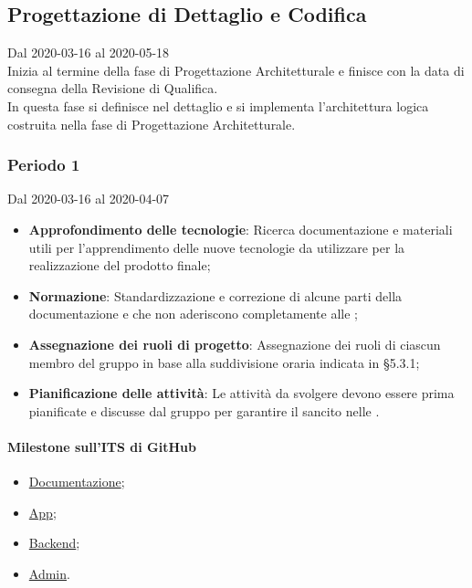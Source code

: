 \subsection{Progettazione di Dettaglio e Codifica}
Dal 2020-03-16 al 2020-05-18\\
Inizia al termine della fase di Progettazione Architetturale e finisce con la data di consegna della Revisione di Qualifica.\\
In questa fase si definisce nel dettaglio e si implementa l'architettura logica costruita nella fase di Progettazione Architetturale.

\subsubsection{Periodo 1} 
Dal 2020-03-16 al 2020-04-07
\begin{itemize}
	\item \textbf{Approfondimento delle tecnologie}: Ricerca documentazione e materiali utili per l'apprendimento delle nuove tecnologie da utilizzare per la realizzazione del prodotto finale;
	\item \textbf{Normazione}: Standardizzazione e correzione di alcune parti della documentazione e che non aderiscono completamente alle \NdP{};
	\item \textbf{Assegnazione dei ruoli di progetto}: Assegnazione dei ruoli di ciascun membro del gruppo in base alla suddivisione oraria indicata in §5.3.1;
	\item \textbf{Pianificazione delle attività}: Le attività da svolgere devono essere prima pianificate e discusse dal gruppo per garantire il  sancito nelle \NdP{}.
\end{itemize}
\paragraph{Milestone sull'ITS di GitHub}
\begin{itemize}
	\item \href{https://github.com/qb-team/Stalker-Documentazione/milestone/11}{Documentazione};
	\item \href{https://github.com/qb-team/Stalker-App/milestone/1}{App};
	\item \href{https://github.com/qb-team/Stalker-Backend/milestone/1}{Backend};
	\item \href{https://github.com/qb-team/Stalker-Admin/milestone/1}{Admin}.
\end{itemize}

